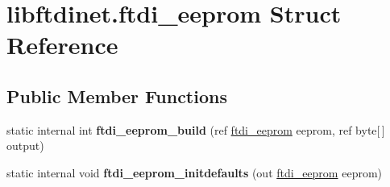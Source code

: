 \hypertarget{structlibftdinet_1_1ftdi__eeprom}{}\section{libftdinet.\+ftdi\+\_\+eeprom Struct Reference}
\label{structlibftdinet_1_1ftdi__eeprom}
\subsection*{Public Member Functions}
\begin{DoxyCompactItemize}
\item 
\mbox{\label{structlibftdinet_1_1ftdi__eeprom_a587918ba0f4a4ca642b9db8fa873560d}} 
static internal int {\bfseries ftdi\+\_\+eeprom\+\_\+build} (ref \mbox{\hyperlink{structlibftdinet_1_1ftdi__eeprom}{ftdi\+\_\+eeprom}} eeprom, ref byte\mbox{[}$\,$\mbox{]} output)
\item 
\mbox{\label{structlibftdinet_1_1ftdi__eeprom_a4bb7e9b6ffb591a9307a5e35c65d03b6}} 
static internal void {\bfseries ftdi\+\_\+eeprom\+\_\+initdefaults} (out \mbox{\hyperlink{structlibftdinet_1_1ftdi__eeprom}{ftdi\+\_\+eeprom}} eeprom)
\end{DoxyCompactItemize}
